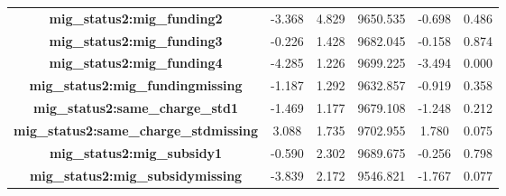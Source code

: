 \documentclass[
  man,
  floatsintext,
  longtable,
  nolmodern,
  notxfonts,
  notimes,
  colorlinks=true,linkcolor=blue,citecolor=blue,urlcolor=blue]{apa7}
\begin{document}
\begin{table}
\begin{longtable*}[t]{>{}cccccc}
\textbf{mig\_status2:mig\_funding2} & -3.368 & 4.829 & 9650.535 & -0.698 & 0.486\\
\textbf{mig\_status2:mig\_funding3} & -0.226 & 1.428 & 9682.045 & -0.158 & 0.874\\
\addlinespace
\textbf{mig\_status2:mig\_funding4} & -4.285 & 1.226 & 9699.225 & -3.494 & 0.000\\
\textbf{mig\_status2:mig\_fundingmissing} & -1.187 & 1.292 & 9632.857 & -0.919 & 0.358\\
\textbf{mig\_status2:same\_charge\_std1} & -1.469 & 1.177 & 9679.108 & -1.248 & 0.212\\
\textbf{mig\_status2:same\_charge\_stdmissing} & 3.088 & 1.735 & 9702.955 & 1.780 & 0.075\\
\textbf{mig\_status2:mig\_subsidy1} & -0.590 & 2.302 & 9689.675 & -0.256 & 0.798\\
\addlinespace
\textbf{mig\_status2:mig\_subsidymissing} & -3.839 & 2.172 & 9546.821 & -1.767 & 0.077\\
\bottomrule
\end{longtable*}
\endgroup{}

\end{table}
\end{document}
